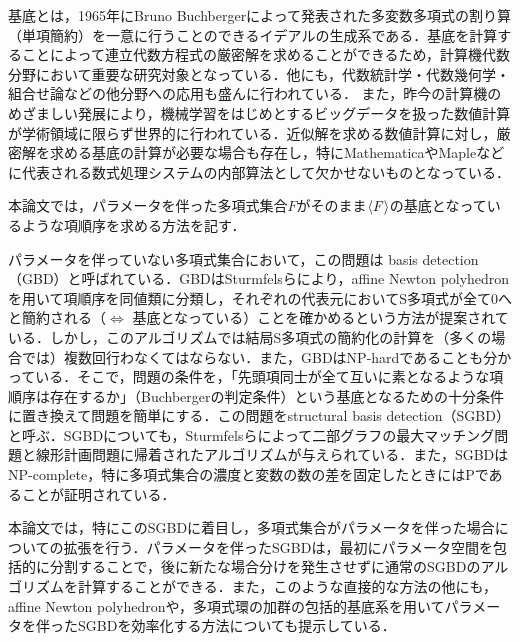 \groebner{}基底とは，1965年にBruno Buchbergerによって発表された多変数多項式の割り算（単項簡約）を一意に行うことのできるイデアルの生成系である．\groebner{}基底を計算することによって連立代数方程式の厳密解を求めることができるため，計算機代数分野において重要な研究対象となっている．他にも，代数統計学・代数幾何学・組合せ論などの他分野への応用も盛んに行われている．
また，昨今の計算機のめざましい発展により，機械学習をはじめとするビッグデータを扱った数値計算が学術領域に限らず世界的に行われている．近似解を求める数値計算に対し，厳密解を求める\groebner{}基底の計算が必要な場合も存在し，特にMathematicaやMapleなどに代表される数式処理システムの内部算法として欠かせないものとなっている．
\par
本論文では，パラメータを伴った多項式集合$F$がそのまま$\langle F \rangle$の\groebner{}基底となっているような項順序を求める方法を記す．
\par
パラメータを伴っていない多項式集合において，この問題は\groebner{} basis detection（GBD）と呼ばれている．GBDはSturmfelsらにより，affine Newton polyhedronを用いて項順序を同値類に分類し，それぞれの代表元においてS多項式が全て$0$へと簡約される（$\Leftrightarrow$ \groebner{}基底となっている）ことを確かめるという方法が提案されている\cite{gritzmann1993minkowski}．しかし，このアルゴリズムでは結局S多項式の簡約化の計算を（多くの場合では）複数回行わなくてはならない．また，GBDはNP-hardであることも分かっている\cite[Corollary11]{sturmfels1997structural}．そこで，問題の条件を，「先頭項同士が全て互いに素となるような項順序は存在するか」（Buchbergerの判定条件）という\groebner{}基底となるための十分条件に置き換えて問題を簡単にする．この問題をstructural \groebner{} basis detection（SGBD）と呼ぶ．SGBDについても，Sturmfelsらによって二部グラフの最大マッチング問題と線形計画問題に帰着されたアルゴリズムが与えられている．また，SGBDはNP-complete\cite[Theorem2]{sturmfels1997structural}，特に多項式集合の濃度と変数の数の差を固定したときにはPである\cite[Corollary3]{sturmfels1997structural}ことが証明されている．
\par
本論文では，特にこのSGBDに着目し，多項式集合がパラメータを伴った場合についての拡張を行う．パラメータを伴ったSGBDは，最初にパラメータ空間を包括的に分割することで，後に新たな場合分けを発生させずに通常のSGBDのアルゴリズムを計算することができる．また，このような直接的な方法の他にも，affine Newton polyhedronや，多項式環の加群の包括的\groebner{}基底系を用いてパラメータを伴ったSGBDを効率化する方法についても提示している．









